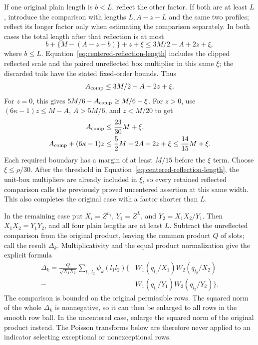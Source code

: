 \documentclass[11pt,a4paper]{article}
\numberwithin{equation}{section}
\numberwithin{figure}{section}
\theoremstyle{definition}
\theoremstyle{remark}
\begin{document}
If one original plain length is \(b<L\), reflect the other factor.
If both are at least \(L\), introduce the comparison with lengths
\(L,A-z-L\) and the same two profiles; reflect its longer factor
only when estimating the comparison separately.  In both cases the
total length after that reflection is at most
\[
 b+\{M-(A-z-b)\}+z+\xi
 \le 3M/2-A+2z+\xi,
\]
where \(b\le L\).  Equation~\eqref{eq:centered-reflection-length}
includes the clipped reflected scale and the paired unreflected box
multiplier in this same \(\xi\); the discarded tails have the stated
fixed-order bounds.  Thus
\begin{equation}
 A_{\rm comp}\le3M/2-A+2z+\xi.
 \label{old-eq:3.11}
\end{equation}
For \(z=0\), this gives
\(5M/6-A_{\rm comp}\ge M/6-\xi\).  For \(z>0\), use
\((6\kappa-1)z\le M-A\), \(A>5M/6\), and \(z<M/20\) to get
\begin{equation}
 \begin{aligned}
 A_{\rm comp}&\le\frac{23}{30}M+\xi,\\
 A_{\rm comp}+(6\kappa-1)z
 &\le\frac52M-2A+2z+\xi\le\frac{14}{15}M+\xi.
 \end{aligned}
 \label{eq:comparison-uncentered-margin}
\end{equation}
Each required boundary has a margin of at least \(M/15\) before
the \(\xi\) term.  Choose \(\xi\le\rho/30\).  After the threshold in
Equation~\eqref{eq:centered-reflection-length}, the unit-box multipliers
are already included in \(\xi\), so every retained reflected
comparison calls the previously proved uncentered assertion at this
same width.  This also completes the original case with a factor
shorter than \(L\).

In the remaining case put \(X_i=Z^{n_i}\),
\(Y_1=Z^L\), and \(Y_2=X_1X_2/Y_1\).  Then
\(X_1X_2=Y_1Y_2\), and all four plain lengths are at least \(L\).
Subtract the unreflected comparison from the original product,
leaving the common product \(Q\) of slots; call the result
\(\Delta_k\).  Multiplicativity and the equal product normalization
give the explicit formula
\[
 \begin{split}
 \Delta_k
 =\frac{Q}{\sqrt{X_1X_2}}\sum_{l_1,l_2}\psi_k(l_1l_2)
 \bigl\{
 &W_1(q_{l_1}/X_1)W_2(q_{l_2}/X_2)\\
 -{}&W_1(q_{l_1}/Y_1)W_2(q_{l_2}/Y_2)
 \bigr\}.
 \end{split}
\]
The comparison is bounded on the original permissible
rows.  The squared norm of the whole \(\Delta_k\) is nonnegative,
so it can then be enlarged to all rows in the smooth row ball.  In
the uncentered case, enlarge the squared norm of the original
product instead.  The Poisson transforms below are therefore never
applied to an indicator selecting exceptional or nonexceptional rows.
\end{document}
